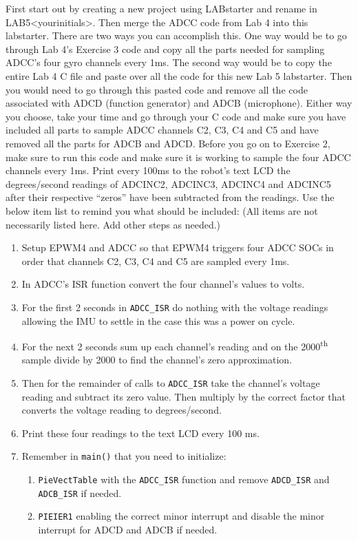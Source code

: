 \documentclass[11pt]{article}
\begin{document}
First start out by creating a new project using LABstarter and rename in LAB5\textless yourinitials\textgreater. Then merge the ADCC code from Lab 4 into this labstarter. There are two ways you can accomplish this. One way would be to go through Lab 4’s Exercise 3 code and copy all the parts needed for sampling ADCC’s four gyro channels every 1ms. The second way would be to copy the entire Lab 4 C file and paste over all the code for this new Lab 5 labstarter. Then you would need to go through this pasted code and remove all the code associated with ADCD (function generator) and ADCB (microphone). Either way you choose, take your time and go through your C code and make sure you have included all parts to sample ADCC channels C2, C3, C4 and C5 and have removed all the parts for ADCB and ADCD. Before you go on to Exercise 2, make sure to run this code and make sure it is working to sample the four ADCC channels every 1ms. Print every 100ms to the robot’s text LCD the degrees/second readings of ADCINC2, ADCINC3, ADCINC4 and ADCINC5 after their respective “zeros” have been subtracted from the readings. Use the below item list to remind you what should be included: (All items are not necessarily listed here. Add other steps as needed.)
%
\begin{enumerate}
    \item Setup EPWM4 and ADCC so that EPWM4 triggers four ADCC SOCs in order that channels C2, C3, C4 and C5 are sampled every 1ms.
    \item In ADCC’s ISR function convert the four channel’s values to volts.
        \item For the first 2 seconds in \texttt{ADCC_ISR} do nothing with the voltage readings allowing the IMU to settle in the case this was a power on cycle.
    \item For the next 2 seconds sum up each channel’s reading and on the 2000\textsuperscript{th} sample divide by 2000 to find the channel’s zero approximation.
        \item Then for the remainder of calls to \texttt{ADCC_ISR} take the channel’s voltage reading and subtract its zero value. Then multiply by the correct factor that converts the voltage reading to degrees/second.
    \item Print these four readings to the text LCD every 100 ms.
        \item Remember in \texttt{main()} that you need to initialize:
        \begin{enumerate}
                \item \texttt{PieVectTable} with the \texttt{ADCC_ISR} function and remove \texttt{ADCD_ISR} and \texttt{ADCB_ISR} if needed.
                \item \texttt{PIEIER1} enabling the correct minor interrupt and disable the minor interrupt for ADCD and ADCB if needed.
        \end{enumerate}
\end{enumerate}
\end{document}
